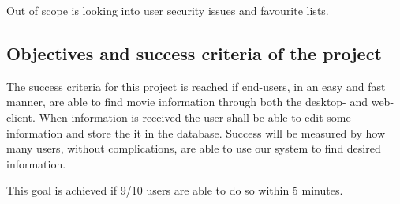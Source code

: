 Out of scope is looking into user security issues and favourite lists.


\subsection{Objectives and success criteria of the project}

The success criteria for this project is reached if end-users, in an easy and fast manner, are able to find movie information through both the desktop- and web-client. When information is received the user shall be able to edit some information and store the it in the database. Success will be measured by how many users, without complications, are able to use our system to find desired information.

This goal is achieved if 9/10 users are able to do so within 5 minutes.


